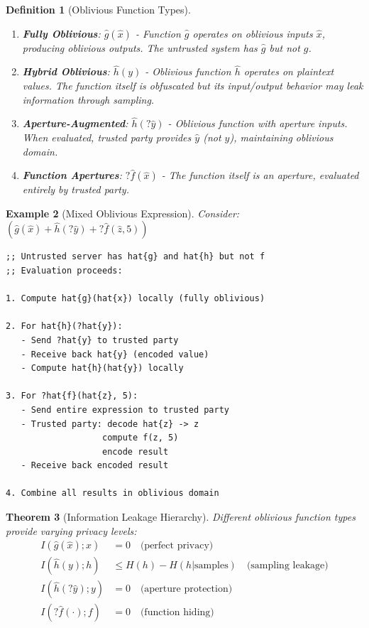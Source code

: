 \documentclass[12pt]{article}
\newtheorem{theorem}{Theorem}
\newtheorem{definition}[theorem]{Definition}
\newtheorem{example}[theorem]{Example}
\begin{document}
\begin{definition}[Oblivious Function Types]
\begin{enumerate}
    \item \textbf{Fully Oblivious}: $\hat{g}(\hat{x})$ - Function $\hat{g}$ operates on oblivious inputs $\hat{x}$, producing oblivious outputs. The untrusted system has $\hat{g}$ but not $g$.
    
    \item \textbf{Hybrid Oblivious}: $\hat{h}(y)$ - Oblivious function $\hat{h}$ operates on plaintext values. The function itself is obfuscated but its input/output behavior may leak information through sampling.
    
    \item \textbf{Aperture-Augmented}: $\hat{h}(?\hat{y})$ - Oblivious function with aperture inputs. When evaluated, trusted party provides $\hat{y}$ (not $y$), maintaining oblivious domain.
    
    \item \textbf{Function Apertures}: $?\hat{f}(\hat{x})$ - The function itself is an aperture, evaluated entirely by trusted party.
\end{enumerate}
\end{definition}

\begin{example}[Mixed Oblivious Expression]
Consider: $(\hat{g}(\hat{x}) + \hat{h}(?\hat{y}) + ?\hat{f}(\hat{z}, 5))$
\begin{lstlisting}
;; Untrusted server has hat{g} and hat{h} but not f
;; Evaluation proceeds:

1. Compute hat{g}(hat{x}) locally (fully oblivious)

2. For hat{h}(?hat{y}):
   - Send ?hat{y} to trusted party
   - Receive back hat{y} (encoded value)
   - Compute hat{h}(hat{y}) locally

3. For ?hat{f}(hat{z}, 5):
   - Send entire expression to trusted party
   - Trusted party: decode hat{z} -> z
                   compute f(z, 5)
                   encode result
   - Receive back encoded result

4. Combine all results in oblivious domain
\end{lstlisting}
\end{example}

\begin{theorem}[Information Leakage Hierarchy]
Different oblivious function types provide varying privacy levels:
\begin{align}
I(\hat{g}(\hat{x}); x) &= 0 \quad \text{(perfect privacy)} \\
I(\hat{h}(y); h) &\leq H(h) - H(h|\text{samples}) \quad \text{(sampling leakage)} \\
I(\hat{h}(?\hat{y}); y) &= 0 \quad \text{(aperture protection)} \\
I(?\hat{f}(\cdot); f) &= 0 \quad \text{(function hiding)}
\end{align}
\end{theorem}
\end{document}
